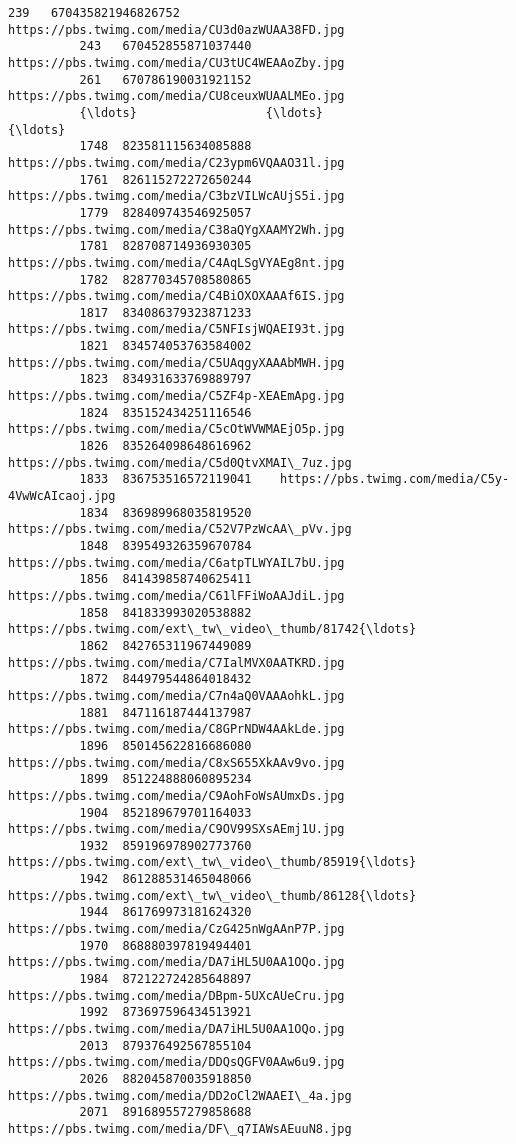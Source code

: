 \documentclass[11pt]{article}
\begin{document}
\begin{Verbatim}[commandchars=\\\{\}]
          239   670435821946826752    https://pbs.twimg.com/media/CU3d0azWUAA38FD.jpg   
          243   670452855871037440    https://pbs.twimg.com/media/CU3tUC4WEAAoZby.jpg   
          261   670786190031921152    https://pbs.twimg.com/media/CU8ceuxWUAALMEo.jpg   
          {\ldots}                  {\ldots}                                                {\ldots}   
          1748  823581115634085888    https://pbs.twimg.com/media/C23ypm6VQAAO31l.jpg   
          1761  826115272272650244    https://pbs.twimg.com/media/C3bzVILWcAUjS5i.jpg   
          1779  828409743546925057    https://pbs.twimg.com/media/C38aQYgXAAMY2Wh.jpg   
          1781  828708714936930305    https://pbs.twimg.com/media/C4AqLSgVYAEg8nt.jpg   
          1782  828770345708580865    https://pbs.twimg.com/media/C4BiOXOXAAAf6IS.jpg   
          1817  834086379323871233    https://pbs.twimg.com/media/C5NFIsjWQAEI93t.jpg   
          1821  834574053763584002    https://pbs.twimg.com/media/C5UAqgyXAAAbMWH.jpg   
          1823  834931633769889797    https://pbs.twimg.com/media/C5ZF4p-XEAEmApg.jpg   
          1824  835152434251116546    https://pbs.twimg.com/media/C5cOtWVWMAEjO5p.jpg   
          1826  835264098648616962    https://pbs.twimg.com/media/C5d0QtvXMAI\_7uz.jpg   
          1833  836753516572119041    https://pbs.twimg.com/media/C5y-4VwWcAIcaoj.jpg   
          1834  836989968035819520    https://pbs.twimg.com/media/C52V7PzWcAA\_pVv.jpg   
          1848  839549326359670784    https://pbs.twimg.com/media/C6atpTLWYAIL7bU.jpg   
          1856  841439858740625411    https://pbs.twimg.com/media/C61lFFiWoAAJdiL.jpg   
          1858  841833993020538882  https://pbs.twimg.com/ext\_tw\_video\_thumb/81742{\ldots}   
          1862  842765311967449089    https://pbs.twimg.com/media/C7IalMVX0AATKRD.jpg   
          1872  844979544864018432    https://pbs.twimg.com/media/C7n4aQ0VAAAohkL.jpg   
          1881  847116187444137987    https://pbs.twimg.com/media/C8GPrNDW4AAkLde.jpg   
          1896  850145622816686080    https://pbs.twimg.com/media/C8xS655XkAAv9vo.jpg   
          1899  851224888060895234    https://pbs.twimg.com/media/C9AohFoWsAUmxDs.jpg   
          1904  852189679701164033    https://pbs.twimg.com/media/C9OV99SXsAEmj1U.jpg   
          1932  859196978902773760  https://pbs.twimg.com/ext\_tw\_video\_thumb/85919{\ldots}   
          1942  861288531465048066  https://pbs.twimg.com/ext\_tw\_video\_thumb/86128{\ldots}   
          1944  861769973181624320    https://pbs.twimg.com/media/CzG425nWgAAnP7P.jpg   
          1970  868880397819494401    https://pbs.twimg.com/media/DA7iHL5U0AA1OQo.jpg   
          1984  872122724285648897    https://pbs.twimg.com/media/DBpm-5UXcAUeCru.jpg   
          1992  873697596434513921    https://pbs.twimg.com/media/DA7iHL5U0AA1OQo.jpg   
          2013  879376492567855104    https://pbs.twimg.com/media/DDQsQGFV0AAw6u9.jpg   
          2026  882045870035918850    https://pbs.twimg.com/media/DD2oCl2WAAEI\_4a.jpg   
          2071  891689557279858688    https://pbs.twimg.com/media/DF\_q7IAWsAEuuN8.jpg   
          

\end{Verbatim}
\end{document}
